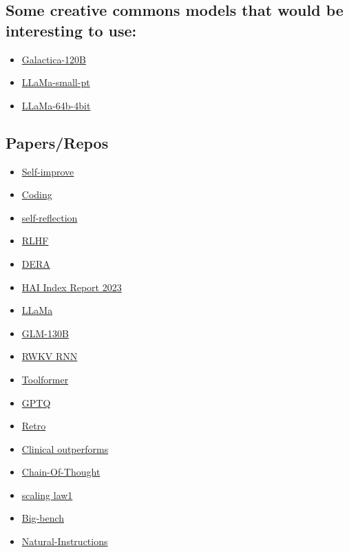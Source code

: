 \documentclass{article}
\begin{document}
\subsection*{Some creative commons models that would be interesting to use:}
\begin{itemize}
    \item \href{https://huggingface.co/facebook/galactica-120b}{Galactica-120B}
    \item \href{https://huggingface.co/decapoda-research/llama-smallint-pt}{LLaMa-small-pt}
\item \href{https://huggingface.co/maderix/llama-65b-4bit/tree/main}{LLaMa-64b-4bit}
\end{itemize}

\subsection*{Papers/Repos}
\begin{itemize}
    \item \href{https://arxiv.org/abs/2210.11610}{Self-improve}
    \item \href{https://arxiv.org/abs/2303.17491}{Coding}
    \item \href{https://arxiv.org/abs/2303.11366}{self-reflection}
    \item \href{https://arxiv.org/abs/2204.05862}{RLHF}
    \item \href{https://arxiv.org/abs/2303.17071}{DERA}
    \item \href{https://aiindex.stanford.edu/report/}{HAI Index Report 2023}
    \item \href{https://arxiv.org/abs/2302.13971}{LLaMa}
    \item \href{https://github.com/THUDM/GLM-130B}{GLM-130B}
    \item \href{https://github.com/BlinkDL/RWKV-LM}{RWKV RNN}
    \item \href{https://arxiv.org/abs/2302.04761}{Toolformer}
    \item \href{https://github.com/qwopqwop200/GPTQ-for-LLaMa}{GPTQ}
    \item \href{https://www.deepmind.com/publications/improving-language-models-by-retrieving-from-trillions-of-tokens}{Retro}
    \item \href{https://arxiv.org/abs/2302.08091}{Clinical outperforms}
    \item \href{https://github.com/amazon-science/mm-cot}{Chain-Of-Thought}
    \item \href{https://arxiv.org/abs/2203.15556}{scaling law1}
    \item \href{https://github.com/google/BIG-bench}{Big-bench}
    \item \href{https://github.com/allenai/natural-instructions}{Natural-Instructions}
\end{itemize}
\end{document}
